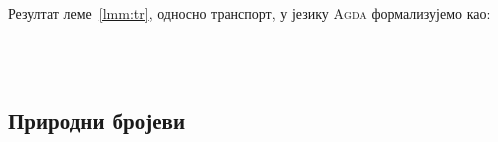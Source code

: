 \begin{code}
\\
\>[.][@{}l@{}]\<[1615I]%
\>[10]\AgdaSpace{}%
\AgdaSpace{}%
\AgdaSpace{}%
\AgdaSymbol{(}\AgdaSpace{}%
\AgdaSpace{}%
\AgdaSymbol{)}\AgdaSpace{}%
\AgdaOperator{\AgdaFunction{==}}\AgdaSpace{}%
\AgdaSpace{}%
\AgdaSpace{}%
\AgdaSpace{}%
\AgdaSpace{}%
\AgdaSpace{}%
\AgdaSpace{}%
\<%
\\
\>[0]\AgdaSpace{}%
\AgdaSpace{}%
\AgdaSymbol{(}\AgdaSpace{}%
\AgdaSymbol{)}\AgdaSpace{}%
\AgdaSpace{}%
\AgdaSymbol{=}\AgdaSpace{}%
\AgdaSpace{}%
\AgdaSymbol{(}\AgdaSpace{}%
\AgdaSpace{}%
\AgdaSymbol{)}\<%
\end{code}

Резултат леме~\ref{lmm:tr}, односно транспорт, у језику \textsc{Agda} формализујемо као:
\begin{code}%
\>[0]%
\>[1668I]\AgdaSymbol{:}\AgdaSpace{}%
\AgdaSymbol{\{}\AgdaSpace{}%
\AgdaSymbol{:}\AgdaSpace{}%
\AgdaSpace{}%
\AgdaSpace{}%
\AgdaSymbol{\}}\AgdaSpace{}%
\AgdaSymbol{(}\AgdaSpace{}%
\AgdaSymbol{:}\AgdaSpace{}%
\AgdaSpace{}%
\AgdaSpace{}%
\AgdaSpace{}%
\AgdaSpace{}%
\AgdaSymbol{)}\AgdaSpace{}%
\AgdaSymbol{\{}\AgdaSpace{}%
\AgdaSpace{}%
\AgdaSymbol{:}\AgdaSpace{}%
\AgdaSymbol{\}}\<%
\\
\>[.][@{}l@{}]\<[1668I]%
\>[3]\AgdaSpace{}%
\AgdaSpace{}%
\AgdaOperator{\AgdaFunction{==}}\AgdaSpace{}%
\AgdaSpace{}%
\AgdaSpace{}%
\AgdaSpace{}%
\AgdaSpace{}%
\AgdaSpace{}%
\AgdaSpace{}%
\<%
\\
\>[0]\AgdaSpace{}%
\AgdaSpace{}%
\AgdaSymbol{(}\AgdaSpace{}%
\AgdaSymbol{)}\AgdaSpace{}%
\AgdaSymbol{=}\AgdaSpace{}%
\AgdaSpace{}%
\AgdaSpace{}%
\AgdaSpace{}%
\<%
\end{code}

\subsection{Природни бројеви}

